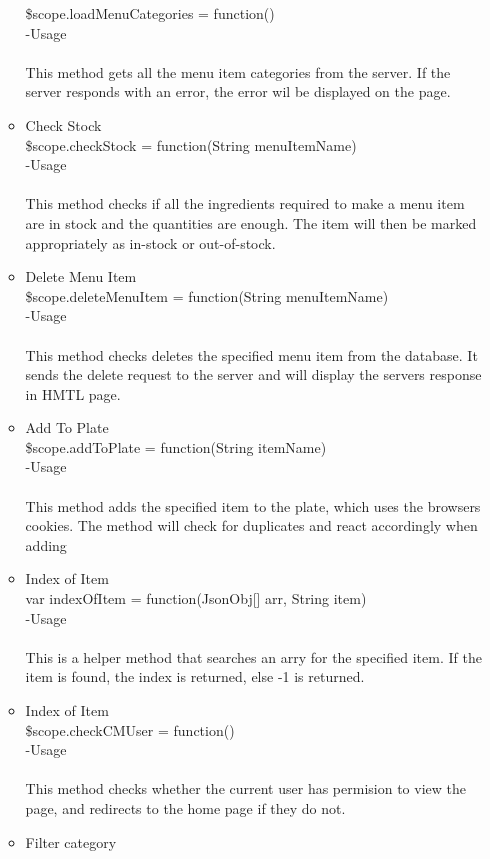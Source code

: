 \documentclass[a4paper,12pt]{report}
\begin{document}
\begin{enumerate}
\begin{itemize}
		\$scope.loadMenuCategories = function()\\
		-Usage\\ \\
		This method gets all the menu item categories from the server. If the server responds with an error, the error wil be displayed on the page.
		\item Check Stock\\
		\$scope.checkStock = function(String menuItemName)\\
		-Usage\\ \\
		This method checks if all the ingredients required to make a menu item are in stock and the quantities are enough. The item will then be marked appropriately as in-stock or out-of-stock.
		\item Delete Menu Item\\
		\$scope.deleteMenuItem = function(String menuItemName)\\
		-Usage\\ \\
		This method checks deletes the specified menu item from the database. It sends the delete request to the server and will display the servers response in HMTL page.
		\item Add To Plate\\
		\$scope.addToPlate = function(String itemName)\\
		-Usage\\ \\
		This method adds the specified item to the plate, which uses the browsers cookies. The method will check for duplicates and react accordingly when adding
		\item Index of Item\\
		var indexOfItem = function(JsonObj[] arr, String item)\\
		-Usage\\ \\
		This is a helper method that searches an arry for the specified item. If the item is found, the index is returned, else -1 is returned.
		\item Index of Item\\
		\$scope.checkCMUser = function()\\
		-Usage\\ \\
		This method checks whether the current user has permision to view the page, and redirects to the home page if they do not.
		\item Filter category\\

\end{itemize}
\end{enumerate}
\end{document}
